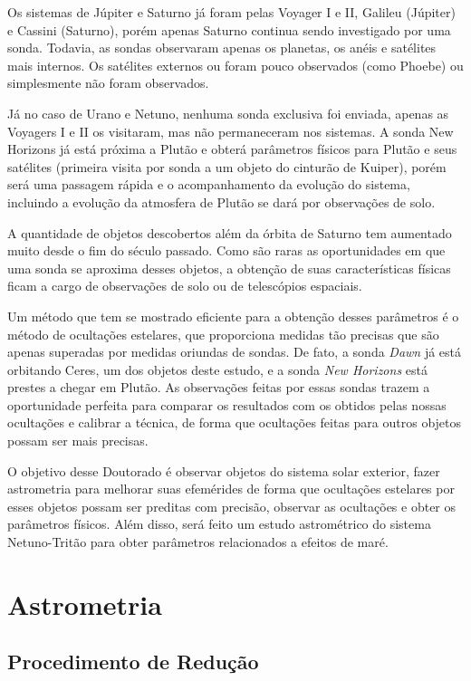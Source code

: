 \documentclass[12pt,a4paper]{monografia}
\begin{document}
Os sistemas de Júpiter e Saturno já foram pelas Voyager I e II, Galileu (Júpiter) e Cassini (Saturno), porém apenas Saturno continua sendo investigado por uma sonda. Todavia, as sondas observaram apenas os planetas, os anéis e satélites mais internos. Os satélites externos ou foram pouco observados (como Phoebe) ou simplesmente não foram observados.

Já no caso de Urano e Netuno, nenhuma sonda exclusiva foi enviada, apenas as Voyagers I e II os visitaram, mas não permaneceram nos sistemas. A sonda New Horizons já está próxima a Plutão e obterá parâmetros físicos para Plutão e seus satélites (primeira visita por sonda a um objeto do cinturão de Kuiper), porém será uma passagem rápida e o acompanhamento da evolução do sistema, incluindo a evolução da atmosfera de Plutão se dará por observações de solo.

A quantidade de objetos descobertos além da órbita de Saturno tem aumentado muito desde o fim do século passado. Como são raras as oportunidades em que uma sonda se aproxima desses objetos, a obtenção de suas características físicas ficam a cargo de observações de solo ou de
telescópios espaciais.

Um método que tem se mostrado eficiente para a obtenção desses parâmetros é o método de ocultações estelares, que proporciona medidas tão precisas que são apenas superadas por medidas oriundas de sondas. De fato, a sonda \textit{Dawn} já está orbitando Ceres, um dos objetos deste estudo, e a sonda \textit{New Horizons} está prestes a chegar em Plutão. As observações feitas por essas sondas trazem a oportunidade perfeita para comparar os resultados com os obtidos pelas nossas ocultações e calibrar a técnica, de forma que ocultações feitas para outros objetos possam ser mais precisas.

O objetivo desse Doutorado é observar objetos do sistema solar exterior, fazer astrometria para melhorar suas efemérides de forma que ocultações estelares por esses objetos possam ser preditas com precisão, observar as ocultações e obter os parâmetros físicos. Além disso, será feito um estudo astrométrico do sistema Netuno-Tritão para obter parâmetros relacionados a efeitos de maré. 


\chapter{Astrometria}
\label{Cap: Astrometria}

\section{Procedimento de Redução}
\end{document}
